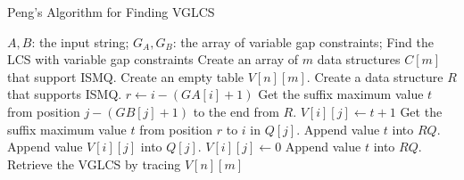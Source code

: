 \begin{algorithm}[!thb]
  \caption{Peng's Algorithm for Finding VGLCS~\cite{Peng2011TheLC}}
  \label{alg:serial-VGLCS}
  \begin{algorithmic}[1]
    \Require
      $A, B$: the input string;
      $G_A, G_B$: the array of variable gap constraints;
    \Ensure Find the LCS with variable gap constraints
    \State Create an array of $m$ data structures $C[m]$ that support ISMQ.
    \State Create an empty table $V[n][m]$.
      \State Create a data structure $R$ that supports ISMQ.
      \State $r \gets i - (GA[i]+1)$
            \State Get the suffix maximum value $t$ from position $j - (GB[j]+1)$ to the end from $R$.
            \State $V[i][j] \gets t + 1$
            \State Get the suffix maximum value $t$ from position $r$ to $i$ in $Q[j]$.
            \State Append value $t$ into $RQ$.
            \State Append value $V[i][j]$ into $Q[j]$.
        \Else
            \State $V[i][j] \gets 0$
            \State {}
            \State Append value $t$ into $RQ$.
        \EndIf
      \EndFor
    \EndFor
    \State Retrieve the VGLCS by tracing $V[n][m]$
  \end{algorithmic}
\end{algorithm}
